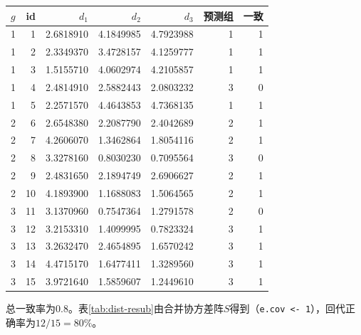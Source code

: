 \par\addvspace{5pt}\begin{center}\begin{minipage}{\linewidth}\centering
\small
{}\label{tab:dist-resub}
\begin{tabular}{lrrrrrr}\toprule
{\bfseries $g$ }&{\bfseries  id }&{\bfseries  $d_1$ }&{\bfseries  $d_2$ }&{\bfseries  $d_3$ }&{\bfseries  预测组 }&{\bfseries  一致}\\\midrule
1 & 1 & 2.6818910 & 4.1849985 & 4.7923988 & 1 & 1\\
1 & 2 & 2.3349370 & 3.4728157 & 4.1259777 & 1 & 1\\
1 & 3 & 1.5155710 & 4.0602974 & 4.2105857 & 1 & 1\\
1 & 4 & 2.4814910 & 2.5882443 & 2.0803232 & 3 & 0\\
1 & 5 & 2.2571570 & 4.4643853 & 4.7368135 & 1 & 1\\
2 & 6 & 2.6548380 & 2.2087790 & 2.4042689 & 2 & 1\\
2 & 7 & 4.2606070 & 1.3462864 & 1.8054116 & 2 & 1\\
2 & 8 & 3.3278160 & 0.8030230 & 0.7095564 & 3 & 0\\
2 & 9 & 2.4831650 & 2.1894749 & 2.6906627 & 2 & 1\\
2 & 10 & 4.1893900 & 1.1688083 & 1.5064565 & 2 & 1\\
3 & 11 & 3.1370960 & 0.7547364 & 1.2791578 & 2 & 0\\
3 & 12 & 3.2153310 & 1.4099995 & 0.7823324 & 3 & 1\\
3 & 13 & 3.2632470 & 2.4654895 & 1.6570242 & 3 & 1\\
3 & 14 & 4.4715170 & 1.6477411 & 1.3289560 & 3 & 1\\
3 & 15 & 3.9721640 & 1.5859607 & 1.2449610 & 3 & 1\\
\bottomrule\end{tabular}
\end{minipage}\end{center}

总一致率为0.8。表\ref{tab:dist-resub}由合并协方差阵$S$得到（\texttt{e.cov <- 1}），回代正确率为$12/15=80\%$。
